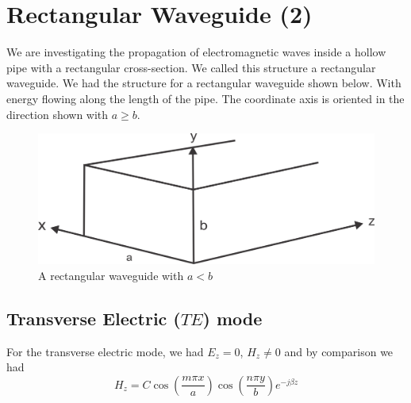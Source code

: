 \chapter{Rectangular Waveguide (2)}

We are investigating the propagation of electromagnetic waves inside a hollow pipe with a rectangular cross-section. We called this structure a rectangular waveguide. We had the structure for a rectangular waveguide shown below. With energy flowing along the length of the pipe. The coordinate axis is oriented in the direction shown with $a\geq b$.
\begin{figure}[h]
\centering
\includegraphics[width=1\linewidth]{./graphics/group39}
\caption{A rectangular waveguide with $a<b$}
\end{figure}

\section{Transverse Electric  ($TE$) mode}
For the transverse electric mode, we had $E_z = 0$, $H_z \neq 0$ and by comparison we had 
\begin{dmath}
H_z = C\cos\left(\frac{m\pi x}{a}\right) \cos\left(\frac{n\pi y}{b}\right)e^{-j\beta z}
\label{eqn:magneticfield}
\end{dmath}

